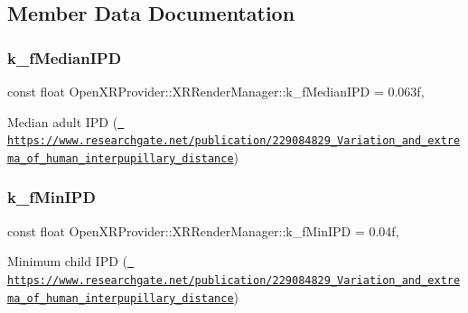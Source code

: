 \subsection{Member Data Documentation}
\mbox{\label{class_open_x_r_provider_1_1_x_r_render_manager_af3050f786bada6f0b3e2416bed3b873f}} 
\subsubsection{\texorpdfstring{k\_fMedianIPD}{k\_fMedianIPD}}
{\footnotesize\ttfamily const float Open\+X\+R\+Provider\+::\+X\+R\+Render\+Manager\+::k\+\_\+f\+Median\+I\+PD = 0.\+063f\hspace{0.3cm}{\ttfamily [static]}, {\ttfamily [private]}}



Median adult I\+PD (\href{https://www.researchgate.net/publication/229084829_Variation_and_extrema_of_human_interpupillary_distance}{\texttt{ https\+://www.\+researchgate.\+net/publication/229084829\+\_\+\+Variation\+\_\+and\+\_\+extrema\+\_\+of\+\_\+human\+\_\+interpupillary\+\_\+distance}}) 

\mbox{\label{class_open_x_r_provider_1_1_x_r_render_manager_a1c86c1472f94b8979d3d63291d2fdd19}} 
\subsubsection{\texorpdfstring{k\_fMinIPD}{k\_fMinIPD}}
{\footnotesize\ttfamily const float Open\+X\+R\+Provider\+::\+X\+R\+Render\+Manager\+::k\+\_\+f\+Min\+I\+PD = 0.\+04f\hspace{0.3cm}{\ttfamily [static]}, {\ttfamily [private]}}



Minimum child I\+PD (\href{https://www.researchgate.net/publication/229084829_Variation_and_extrema_of_human_interpupillary_distance}{\texttt{ https\+://www.\+researchgate.\+net/publication/229084829\+\_\+\+Variation\+\_\+and\+\_\+extrema\+\_\+of\+\_\+human\+\_\+interpupillary\+\_\+distance}}) 

